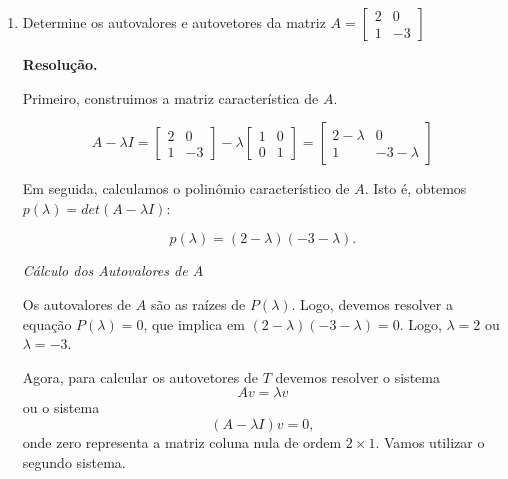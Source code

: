 \begin{enumerate}
\item   Determine os autovalores e autovetores da matriz
$A= \begin{bmatrix}
2 & 0\\
 1& -3
\end{bmatrix}$

\textbf{Resolução.}

Primeiro, construimos a matriz característica de $A$.

$$A-\lambda I=
 \begin{bmatrix}
2 & 0\\
 1& -3
\end{bmatrix} -\lambda
 \begin{bmatrix}
1 & 0\\
 0& 1
\end{bmatrix}=
 \begin{bmatrix}
2-\lambda & 0\\
 1& -3-\lambda
\end{bmatrix}$$

Em seguida, calculamos o polinômio característico de $A$. Isto é, obtemos $p(\lambda)= det(A-\lambda  I)$:

$$p(\lambda)= (2-\lambda)(-3-\lambda).$$

\textit{{Cálculo dos Autovalores de $A$}}

Os autovalores de $A$ são as raízes de $P(\lambda)$. Logo, devemos resolver a equação $P(\lambda)=0$, que implica em $(2-\lambda)(-3-\lambda)=0$. Logo, $\lambda=2$ ou $\lambda=-3$.

Agora, para calcular os autovetores de $T$ devemos resolver o sistema $$Av=\lambda v$$ ou  o sistema $$ (A-\lambda I)v=0,$$ onde zero representa a matriz coluna nula de ordem $2 \times 1$. Vamos utilizar o segundo sistema.


\end{enumerate}
